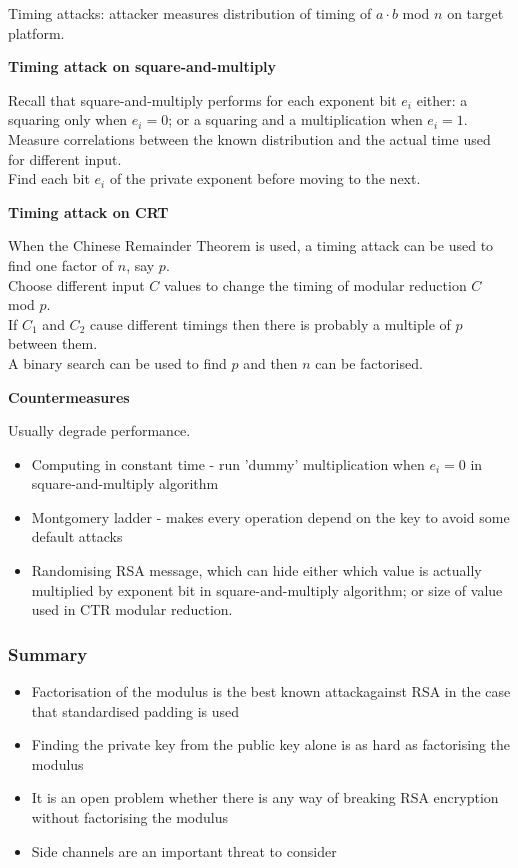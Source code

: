 \documentclass{article}
\begin{document}
Timing attacks: attacker measures distribution of timing of $a \cdot b$ mod $n$ on target platform.

\textbf{Timing attack on square-and-multiply}

Recall that square-and-multiply performs for each exponent bit $e_i$ either: a squaring only when $e_i=0$; or a squaring and a multiplication when $e_i=1$.\\
Measure correlations between the known distribution and the actual time used for different input.\\
Find each bit $e_i$ of the private exponent before moving to the next.

\textbf{Timing attack on CRT}

When the Chinese Remainder Theorem is used, a timing attack can be used to find one factor of $n$, say $p$.\\
Choose different input $C$ values to change the timing of modular reduction $C$ mod $p$.\\
If $C_1$ and $C_2$ cause different timings then there is probably a multiple of $p$ between them.\\
A binary search can be used to find $p$ and then $n$ can be factorised.

\textbf{Countermeasures}

Usually degrade performance.\\
\begin{itemize}
    \item Computing in constant time - run 'dummy' multiplication when $e_i = 0$ in square-and-multiply algorithm
    \item Montgomery ladder - makes every operation depend on the key to avoid some default attacks
    \item Randomising RSA message, which can hide either which value is actually multiplied by exponent bit in square-and-multiply algorithm; or size of value used in CTR modular reduction.
\end{itemize}

\subsubsection{Summary}

\begin{itemize}
    \item Factorisation of the modulus is the best known attackagainst RSA in the case that standardised padding is used
    \item Finding the private key from the public key alone is as hard as factorising the modulus
    \item It is an open problem whether there is any way of breaking RSA encryption without factorising the modulus
    \item Side channels are an important threat to consider
\end{itemize} 
\end{document}
